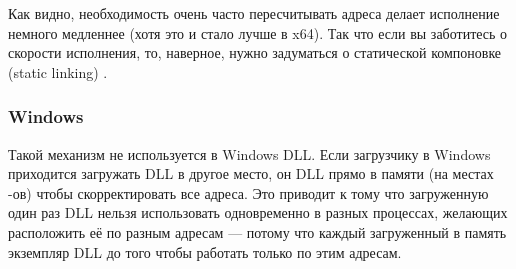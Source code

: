 Как видно, необходимость очень часто пересчитывать адреса делает исполнение немного медленнее 
(хотя это и стало лучше в x64).
Так что если вы заботитесь о скорости исполнения, то, наверное, нужно задуматься о статической компоновке (static linking)
.

\subsubsection{Windows}

Такой механизм не используется в Windows DLL. Если загрузчику в Windows приходится загружать DLL 
в другое место, он  DLL прямо в памяти (на местах -ов) чтобы скорректировать 
все адреса.
Это приводит к тому что загруженную один раз DLL нельзя использовать одновременно в разных 
процессах, желающих расположить её по разным адресам --- потому что каждый загруженный в память 
экземпляр DLL  до того чтобы работать только по этим адресам.

